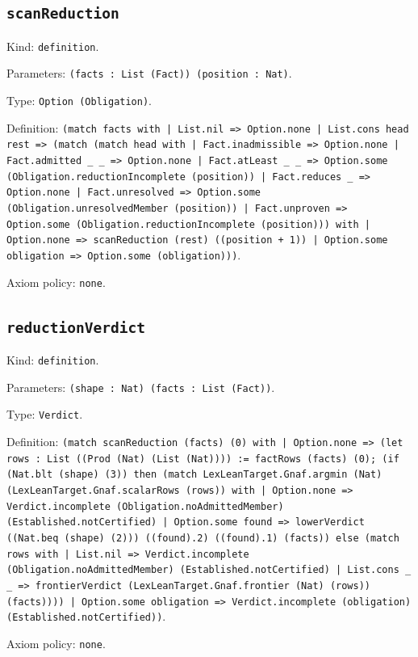 \documentclass[11pt]{article}
\begin{document}
\subsection*{\texttt{scanReduction}}
\noindent Kind: \texttt{definition}.\par
\noindent Parameters: \texttt{(facts : List (Fact)) (position : Nat)}.\par
\noindent Type: \texttt{Option (Obligation)}.\par
\noindent Definition: \texttt{(match facts with | List.nil => Option.none | List.cons head rest => (match (match head with | Fact.inadmissible => Option.none | Fact.admitted \_ \_ => Option.none | Fact.atLeast \_ \_ => Option.some (Obligation.reductionIncomplete (position)) | Fact.reduces \_ => Option.none | Fact.unresolved => Option.some (Obligation.unresolvedMember (position)) | Fact.unproven => Option.some (Obligation.reductionIncomplete (position))) with | Option.none => scanReduction (rest) ((position + 1)) | Option.some obligation => Option.some (obligation)))}.\par
\noindent Axiom policy: \texttt{none}.\par
\subsection*{\texttt{reductionVerdict}}
\noindent Kind: \texttt{definition}.\par
\noindent Parameters: \texttt{(shape : Nat) (facts : List (Fact))}.\par
\noindent Type: \texttt{Verdict}.\par
\noindent Definition: \texttt{(match scanReduction (facts) (0) with | Option.none => (let rows : List ((Prod (Nat) (List (Nat)))) := factRows (facts) (0); (if (Nat.blt (shape) (3)) then (match LexLeanTarget.Gnaf.argmin (Nat) (LexLeanTarget.Gnaf.scalarRows (rows)) with | Option.none => Verdict.incomplete (Obligation.noAdmittedMember) (Established.notCertified) | Option.some found => lowerVerdict ((Nat.beq (shape) (2))) ((found).2) ((found).1) (facts)) else (match rows with | List.nil => Verdict.incomplete (Obligation.noAdmittedMember) (Established.notCertified) | List.cons \_ \_ => frontierVerdict (LexLeanTarget.Gnaf.frontier (Nat) (rows)) (facts)))) | Option.some obligation => Verdict.incomplete (obligation) (Established.notCertified))}.\par
\noindent Axiom policy: \texttt{none}.\par
\end{document}
